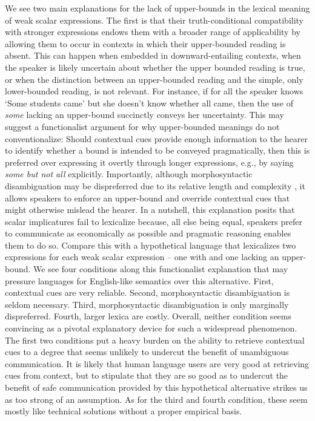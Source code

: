 \documentclass[a4paper]{article}
\begin{document}
We see two main explanations for the lack of upper-bounds in the lexical meaning of weak scalar expressions. The first is that their truth-conditional compatibility with stronger expressions endows them with a broader range of applicability by allowing them to occur in contexts in which their upper-bounded reading is absent. This can happen when embedded in downward-entailing contexts, when the speaker is likely uncertain about whether the upper bounded reading is true, or when the distinction between an upper-bounded reading and the simple, only lower-bounded reading, is not relevant. For instance, if for all the speaker knows `Some students came' but she doesn't know whether all came, then the use of {\em some} lacking an upper-bound succinctly conveys her uncertainty. This may suggest a functionalist argument for why upper-bounded meanings do not conventionalize: Should contextual cues provide enough information to the hearer to identify whether a bound is intended to be conveyed pragmatically, then this is preferred over expressing it overtly through longer expressions, e.g., by saying {\em some but not all} explicitly. Importantly, although morphosyntactic disambiguation may be dispreferred due to its relative length and complexity \citep{piantadosi+etal:2012b}, it allows speakers to enforce an upper-bound and override contextual cues that might otherwise mislead the hearer. In a nutshell, this explanation posits that scalar implicatures fail to lexicalize because, all else being equal, speakers prefer to communicate as economically as possible and pragmatic reasoning enables them to do so. Compare this with a hypothetical language that lexicalizes two expressions for each weak scalar expression -- one with and one lacking an upper-bound. We see four conditions along this functionalist explanation that may pressure languages for English-like semantics over this alternative. First, contextual cues are very reliable. Second, morphosyntactic disambiguation is seldom necessary. Third, morphosyntactic disambiguation is only marginally dispreferred. Fourth, larger lexica are costly. Overall, neither condition seems convincing as a pivotal explanatory device for such a widespread phenomenon. The first two conditions put a heavy burden on the ability to retrieve contextual cues to a degree that seems unlikely to undercut the benefit of unambiguous communication. It is likely that human language users are very good at retrieving cues from context, but to stipulate that they are so good as to undercut the benefit of safe communication provided by this hypothetical alternative strikes us as too strong of an assumption.  As for the third and fourth condition, these seem mostly like technical solutions without a proper empirical basis. 
\end{document}
